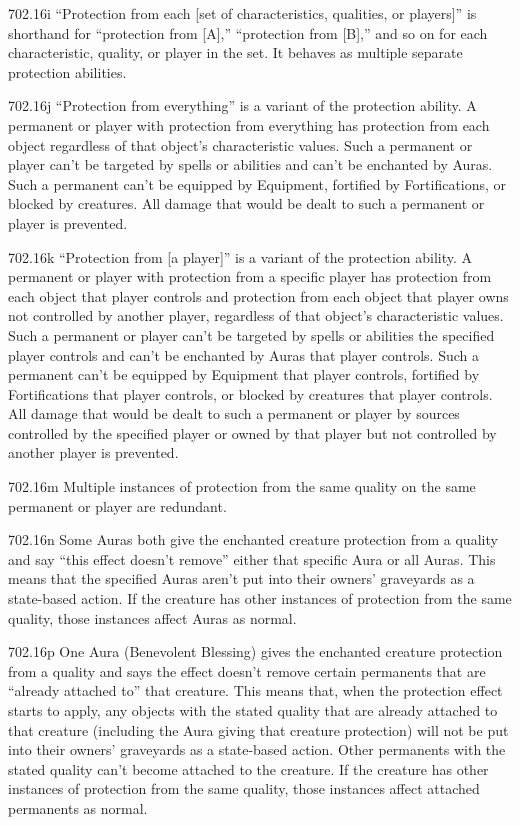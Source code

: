702.16i “Protection from each [set of characteristics, qualities, or players]” is shorthand for “protection from [A],” “protection from [B],” and so on for each characteristic, quality, or player in the set. It behaves as multiple separate protection abilities.

702.16j “Protection from everything” is a variant of the protection ability. A permanent or player with protection from everything has protection from each object regardless of that object’s characteristic values. Such a permanent or player can’t be targeted by spells or abilities and can’t be enchanted by Auras. Such a permanent can’t be equipped by Equipment, fortified by Fortifications, or blocked by creatures. All damage that would be dealt to such a permanent or player is prevented.

702.16k “Protection from [a player]” is a variant of the protection ability. A permanent or player with protection from a specific player has protection from each object that player controls and protection from each object that player owns not controlled by another player, regardless of that object’s characteristic values. Such a permanent or player can’t be targeted by spells or abilities the specified player controls and can’t be enchanted by Auras that player controls. Such a permanent can’t be equipped by Equipment that player controls, fortified by Fortifications that player controls, or blocked by creatures that player controls. All damage that would be dealt to such a permanent or player by sources controlled by the specified player or owned by that player but not controlled by another player is prevented.

702.16m Multiple instances of protection from the same quality on the same permanent or player are redundant.

702.16n Some Auras both give the enchanted creature protection from a quality and say “this effect doesn’t remove” either that specific Aura or all Auras. This means that the specified Auras aren’t put into their owners’ graveyards as a state-based action. If the creature has other instances of protection from the same quality, those instances affect Auras as normal.

702.16p One Aura (Benevolent Blessing) gives the enchanted creature protection from a quality and says the effect doesn’t remove certain permanents that are “already attached to” that creature. This means that, when the protection effect starts to apply, any objects with the stated quality that are already attached to that creature (including the Aura giving that creature protection) will not be put into their owners’ graveyards as a state-based action. Other permanents with the stated quality can’t become attached to the creature. If the creature has other instances of protection from the same quality, those instances affect attached permanents as normal.

